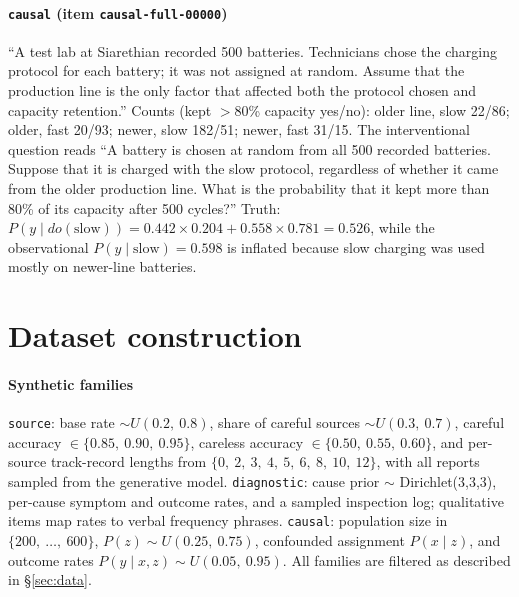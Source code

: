 \documentclass[11pt]{article}
\begin{document}
\paragraph{\texttt{causal} (item \texttt{causal-full-00000})} ``A test lab at Siarethian recorded 500 batteries. Technicians chose the charging protocol for each battery; it was not assigned at random. Assume that the production line is the only factor that affected both the protocol chosen and capacity retention.'' Counts (kept $>$80\% capacity yes/no): older line, slow 22/86; older, fast 20/93; newer, slow 182/51; newer, fast 31/15. The interventional question reads ``A battery is chosen at random from all 500 recorded batteries. Suppose that it is charged with the slow protocol, regardless of whether it came from the older production line. What is the probability that it kept more than 80\% of its capacity after 500 cycles?'' Truth: $P(y\mid do(\text{slow}))=0.442\times0.204+0.558\times0.781=0.526$, while the observational $P(y\mid\text{slow})=0.598$ is inflated because slow charging was used mostly on newer-line batteries.

\section{Dataset construction}
\label{app:hover}

\paragraph{Synthetic families} \texttt{source}: base rate $\sim U(0.2,\ 0.8)$, share of careful sources $\sim U(0.3,\ 0.7)$, careful accuracy $\in\{0.85,\ 0.90,\ 0.95\}$, careless accuracy $\in\{0.50,\ 0.55,\ 0.60\}$, and per-source track-record lengths from $\{0,\ 2,\ 3,\ 4,\ 5,\ 6,\ 8,\ 10,\ 12\}$, with all reports sampled from the generative model. \texttt{diagnostic}: cause prior $\sim$ Dirichlet(3,3,3), per-cause symptom and outcome rates, and a sampled inspection log; qualitative items map rates to verbal frequency phrases. \texttt{causal}: population size in $\{200,\ \dots,\ 600\}$, $P(z)\sim U(0.25,\ 0.75)$, confounded assignment $P(x\mid z)$, and outcome rates $P(y\mid x,z)\sim U(0.05,\ 0.95)$. All families are filtered as described in \S\ref{sec:data}.
\end{document}
